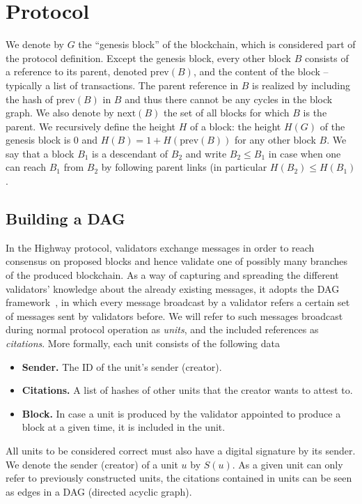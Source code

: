 \documentclass[12pt, fleqn]{article}
\begin{document}
\section{Protocol}
We denote by $G$ the ``genesis block'' of the blockchain, which is considered part of the protocol definition.
%
Except the genesis block, every other block $B$ consists of a reference to its parent, denoted $\mathrm{prev}(B)$, and the content of the block  -- typically a list of transactions.
%
The parent reference in $B$ is realized by including the hash of $\mathrm{prev}(B)$ in $B$ and thus there cannot be any cycles in the block graph.
%
We also denote by $\mathrm{next}(B)$ the set of all blocks for which $B$ is the parent.
%
We recursively define the height $H$ of a block: the height $H(G)$ of the genesis block is $0$ and $H(B)=1+H(\mathrm{prev}(B))$ for any other block $B$.
%
We say that a block $B_1$ is a descendant of $B_2$ and write $B_2\leq B_1$ in case when one can reach $B_1$ from $B_2$ by following parent links (in particular $H(B_2)\leq H(B_1)$.

\subsection{Building a DAG}

In the Highway protocol, validators exchange messages in order to reach consensus on proposed blocks and hence validate one of possibly many branches of the produced blockchain.
%
As a way of capturing and spreading the different validators' knowledge about the already existing messages, it adopts the DAG framework~\cite{baird2016hashgraph,GLSS19,moser1999byzantine,zamfir2018casper}, in which every message broadcast by a validator refers a certain set of  messages sent by validators before.
%
We will refer to such messages broadcast during normal protocol operation as \emph{units}, and the included references as \emph{citations}. More formally, each unit consists of the following data
\begin{itemize}
    \item {\bf Sender.} The ID of the unit's sender (creator).
    \item {\bf Citations.} A list of hashes of other units that the creator wants to attest to. 
    \item {\bf Block.} In case a unit is produced by the validator appointed to produce a block at a given time, it is included in the unit. 
\end{itemize}

All units to be considered correct must also have a digital signature by its sender.
%
We denote the sender (creator) of a unit $u$ by $S(u)$.
%
As a given unit can only refer to previously constructed units, the citations contained in units can be seen as edges in a DAG (directed acyclic graph).
\end{document}

